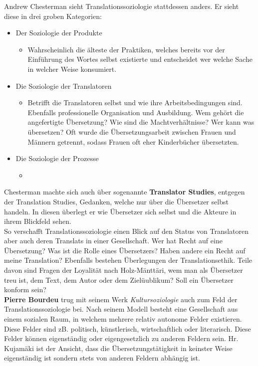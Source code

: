 \documentclass{article}
\begin{document}
	Andrew Chesterman sieht Translationssoziologie stattdessen anders. Er sieht diese in drei groben Kategorien:
	\begin{itemize}
		\item{Der Soziologie der Produkte}
		\begin{itemize}
			\item{Wahrscheinlich die älteste der Praktiken, welches bereits vor der Einführung des Wortes selbst existierte und entscheidet wer welche Sache in welcher Weise konsumiert.}
		\end{itemize}
		\item{Die Soziologie der Translatoren}
		\begin{itemize}
			\item{Betrifft die Translatoren selbst und wie ihre Arbeitsbedingungen sind. Ebenfalls professionelle Organisation und Ausbildung. Wem gehört die angefertigte Übersetzung? Wie sind die Machtverhältnisse? Wer kann was übersetzen? Oft wurde die Übersetzungsarbeit zwischen Frauen und Männern getrennt, sodass Frauen oft eher Kinderbücher übersetzten.}
		\end{itemize}
		\item{Die Soziologie der Prozesse}
		\begin{itemize}
			\item{}
		\end{itemize}
	\end{itemize}
	Chesterman machte sich auch über sogenannte \textbf{Translator Studies}, entgegen der Translation Studies, Gedanken, welche nur über die Übersetzer selbst handeln. In diesen überlegt er wie Übersetzer sich selbst und die Akteure in ihrem Blickfeld sehen. \\
	So verschafft Translationssoziologie einen Blick auf den Status von Translatoren aber auch deren Translats in einer Gesellschaft. Wer hat Recht auf eine Übersetzung? Was ist die Rolle eines Übersetzers? Haben andere ein Recht auf meine Translation? Ebenfalls bestehen Überlegungen der Translationsethik. Teile davon sind Fragen der Loyalität nach Holz-Mänttäri, wem man als Übersetzer treu ist, dem Text, dem Autor oder dem Zielüublikum? Soll ein Übersetzer konform sein? \\
	\textbf{Pierre Bourdeu} trug mit seinem Werk \textit{Kultursoziologie} auch zum Feld der Translationssoziologie bei. Nach seinem Modell besteht eine Gesellschaft aus einem sozialen Raum, in welchem mehrere relativ autonome Felder existieren. Diese Felder sind zB. politisch, künstlerisch, wirtschaftlich oder literarisch. Diese Felder können eigenständig oder eigengesetzlich zu anderen Feldern sein. Hr. Kujamäki ist der Ansicht, dass die Übersetzungstätigkeit in keinster Weise eigenständig ist sondern stets von anderen Feldern abhängig ist. \\
\end{document}
